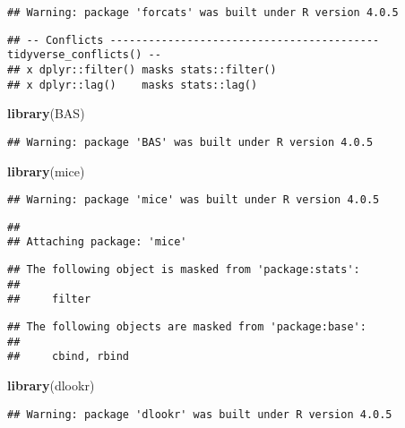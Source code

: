 \documentclass[
]{article}
\newenvironment{Shaded}{\begin{snugshade}}{\end{snugshade}}
\newcommand{\KeywordTok}[1]{\textcolor[rgb]{0.13,0.29,0.53}{\textbf{#1}}}
\newcommand{\NormalTok}[1]{#1}
\begin{document}
\begin{verbatim}
## Warning: package 'forcats' was built under R version 4.0.5
\end{verbatim}

\begin{verbatim}
## -- Conflicts ------------------------------------------ tidyverse_conflicts() --
## x dplyr::filter() masks stats::filter()
## x dplyr::lag()    masks stats::lag()
\end{verbatim}

\begin{Shaded}
\begin{Highlighting}[]
\KeywordTok{library}\NormalTok{(BAS)}
\end{Highlighting}
\end{Shaded}

\begin{verbatim}
## Warning: package 'BAS' was built under R version 4.0.5
\end{verbatim}

\begin{Shaded}
\begin{Highlighting}[]
\KeywordTok{library}\NormalTok{(mice)}
\end{Highlighting}
\end{Shaded}

\begin{verbatim}
## Warning: package 'mice' was built under R version 4.0.5
\end{verbatim}

\begin{verbatim}
## 
## Attaching package: 'mice'
\end{verbatim}

\begin{verbatim}
## The following object is masked from 'package:stats':
## 
##     filter
\end{verbatim}

\begin{verbatim}
## The following objects are masked from 'package:base':
## 
##     cbind, rbind
\end{verbatim}

\begin{Shaded}
\begin{Highlighting}[]
\KeywordTok{library}\NormalTok{(dlookr)}
\end{Highlighting}
\end{Shaded}

\begin{verbatim}
## Warning: package 'dlookr' was built under R version 4.0.5
\end{verbatim}
\end{document}
